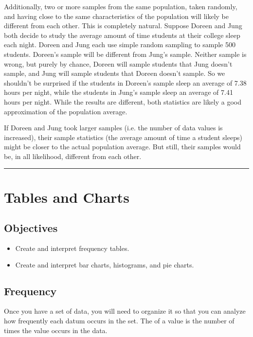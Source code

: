 \documentclass[letterpaper,10pt,english]{jupyterBook}
\begin{document}
\sphinxAtStartPar
Additionally, two or more samples from the same population, taken randomly, and having close to the same characteristics of the population will likely be different from each other. This  is completely natural. Suppose Doreen and Jung both decide to study the average amount of time students at their college sleep each night. Doreen and Jung each use simple random sampling to sample 500 students. Doreen’s sample will be different from Jung’s sample. Neither sample is wrong, but purely by chance, Doreen will sample students that Jung doesn’t sample, and Jung will sample students that Doreen doesn’t sample. So we shouldn’t be surprised if the students in Doreen’s sample sleep an average of 7.38 hours per night, while the students in Jung’s sample sleep an average of 7.41 hours per night. While the results are different, both statistics are likely a good approximation of the population average.

\sphinxAtStartPar
If Doreen and Jung took larger samples (i.e. the number of data values is increased), their sample statistics (the average amount of time a student sleeps) might be closer to the actual population average. But still, their samples would be, in all likelihood, different from each other.


\bigskip\hrule\bigskip


\sphinxstepscope


\section{Tables and Charts}
\label{\detokenize{Ch1 Sampling and Data/1.4 Tables and Charts:tables-and-charts}}\label{\detokenize{Ch1 Sampling and Data/1.4 Tables and Charts::doc}}

\subsection{Objectives}
\label{\detokenize{Ch1 Sampling and Data/1.4 Tables and Charts:objectives}}\begin{itemize}
\item {} 
\sphinxAtStartPar
Create and interpret frequency tables.

\item {} 
\sphinxAtStartPar
Create and interpret bar charts, histograms, and pie charts.

\end{itemize}


\subsection{Frequency}
\label{\detokenize{Ch1 Sampling and Data/1.4 Tables and Charts:frequency}}
\sphinxAtStartPar
Once you have a set of data, you will need to organize it so that you can analyze how frequently each datum occurs in the set. The  of a value is the number of times the value occurs in the data.
\end{document}
